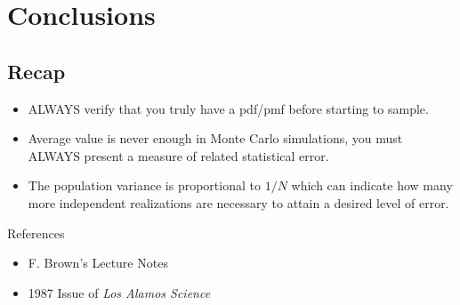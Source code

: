\section{Conclusions}
\subsection{Recap}

\begin{itemize}
   \item ALWAYS verify that you truly have a pdf/pmf before starting to sample.
   \item Average value is never enough in Monte Carlo simulations, you must ALWAYS present a measure of related statistical error.
   \item The population variance is proportional to $1/N$ which can indicate how many more independent realizations are necessary to attain a desired level of error.
  \end{itemize}

References
  \begin{itemize}
   \item F. Brown's Lecture Notes
   \item 1987 Issue of \emph{ Los Alamos Science}
  \end{itemize}
